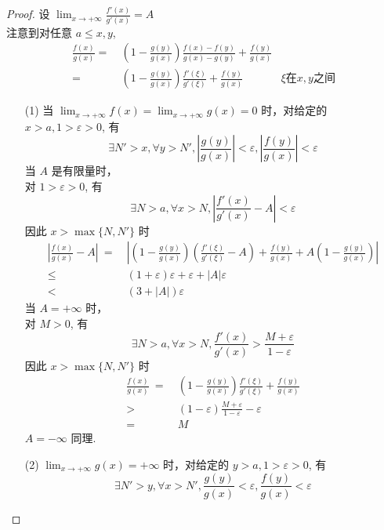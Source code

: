 \documentclass{article}
\begin{document}
\begin{proof}
    设 $\lim_{x \to +\infty}\frac{f'(x)}{g'(x)} = A$ \\
    注意到对任意 $a \leqslant x, y$,
    \begin{align*}
        \frac{f(x)}{g(x)} =\ & \left(1 - \frac{g(y)}{g(x)}\right)\frac{f(x) - f(y)}{g(x) - g(y)} + \frac{f(y)}{g(x)} \\
        =\ & \left(1 - \frac{g(y)}{g(x)}\right)\frac{f'(\xi)}{g'(\xi)} + \frac{f(y)}{g(x)} & \xi \text{在} x, y \text{之间}
    \end{align*}
    \begin{itemize}
        \item [(1)] 当 $\lim_{x \to +\infty}f(x) = \lim_{x \to +\infty}g(x) = 0$ 时，对给定的 $x > a, 1 > \varepsilon > 0$, 有 $$\exists N' > x, \forall y > N', \left\lvert \frac{g(y)}{g(x)}\right\rvert < \varepsilon, \left\lvert \frac{f(y)}{g(x)}\right\rvert < \varepsilon$$ 
        当 $A$ 是有限量时， \\
        对 $1 > \varepsilon > 0$, 有 $$\exists N > a, \forall x > N, \left\lvert \frac{f'(x)}{g'(x)} - A\right\rvert < \varepsilon $$
        因此 $x > \max\{N, N'\}$ 时
        \begin{align*}
            \left\lvert \frac{f(x)}{g(x)} - A\right\rvert\ =\ & \left\lvert \left(1 - \frac{g(y)}{g(x)}\right)\left(\frac{f'(\xi)}{g'(\xi)} - A\right) + \frac{f(y)}{g(x)} + A\left(1 - \frac{g(y)}{g(x)}\right)\right\rvert \\
            \leqslant\ & (1 + \varepsilon) \varepsilon + \varepsilon + \left\lvert A\right\rvert  \varepsilon \\
            <\ & (3 + \left\lvert A\right\rvert )\varepsilon
        \end{align*}
        当 $A = +\infty$ 时， \\
        对 $M > 0$, 有 $$\exists N > a, \forall x > N, \frac{f'(x)}{g'(x)} > \frac{M + \varepsilon}{1 - \varepsilon}$$
        因此 $x > \max\{N, N'\}$ 时
        \begin{align*}
            \frac{f(x)}{g(x)}\ =\ & \left(1 - \frac{g(y)}{g(x)}\right)\frac{f'(\xi)}{g'(\xi)} + \frac{f(y)}{g(x)} \\
            >\ & (1 - \varepsilon)\frac{M + \varepsilon}{1 - \varepsilon} - \varepsilon \\
            =\ & M
        \end{align*}
        $A = -\infty$ 同理.
        \item [(2)] $\lim_{x \to +\infty}g(x) = +\infty$ 时，对给定的 $y > a, 1 > \varepsilon > 0$, 有 $$\exists N' > y, \forall x > N', \frac{g(y)}{g(x)} < \varepsilon, \frac{f(y)}{g(x)} < \varepsilon$$

\end{itemize}
\end{proof}
\end{document}
